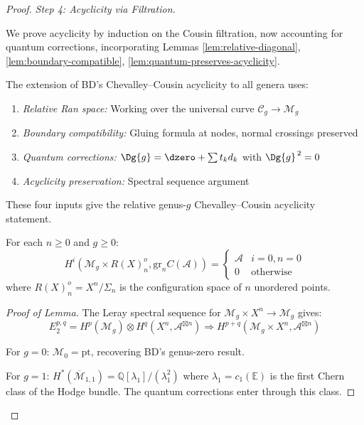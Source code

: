 \begin{proof}
\emph{Step 4: Acyclicity via Filtration.}

We prove acyclicity by induction on the Cousin filtration, now accounting for quantum corrections, incorporating Lemmas \ref{lem:relative-diagonal}, \ref{lem:boundary-compatible}, \ref{lem:quantum-preserves-acyclicity}.

\begin{remark}\label{rem:summary-higher-genus}
The extension of BD's Chevalley--Cousin acyclicity to all genera uses:
\begin{enumerate}
\item \emph{Relative Ran space:} Working over the universal curve $\mathcal{C}_g \to \mathcal{M}_g$
\item \emph{Boundary compatibility:} Gluing formula at nodes, normal crossings preserved
\item \emph{Quantum corrections:} $\Dg{g} = \dzero + \sum t_k d_k$ with $\Dg{g}^{\,2} = 0$
\item \emph{Acyclicity preservation:} Spectral sequence argument
\end{enumerate}

These four inputs give the relative genus-$g$ Chevalley--Cousin
acyclicity statement.
\end{remark}

\begin{lemma}\label{lem:graded-acyclic}
For each $n \geq 0$ and $g \geq 0$:
\[H^i(\mathcal{M}_g \times R(X)_n^o, \text{gr}_n C(\mathcal{A})) =
\begin{cases}
\mathcal{A} & i=0, n=0 \\
0 & \text{otherwise}
\end{cases}\]
where $R(X)_n^o = X^n / \Sigma_n$ is the configuration space of $n$ unordered points.
\end{lemma}

\begin{proof}[Proof of Lemma]
The Leray spectral sequence for $\mathcal{M}_g \times X^n \to \mathcal{M}_g$ gives:
\[E_2^{p,q} = H^p(\mathcal{M}_g) \otimes H^q(X^n, \mathcal{A}^{\boxtimes n})
\Rightarrow H^{p+q}(\mathcal{M}_g \times X^n, \mathcal{A}^{\boxtimes n})\]

For $g=0$: $\mathcal{M}_0 = \text{pt}$, recovering BD's genus-zero result.

For $g=1$: $H^*(\overline{\mathcal{M}}_{1,1}) = \mathbb{Q}[\lambda_1]/(\lambda_1^2)$ where $\lambda_1 = c_1(\mathbb{E})$ is the first Chern class of the Hodge bundle. The quantum corrections enter through this class.


\end{proof}
\end{proof}
